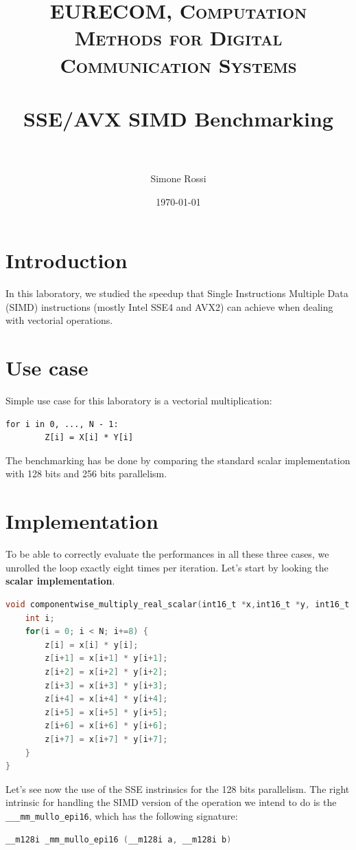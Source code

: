 \documentclass[paper=a4, fontsize=12pt]{scrartcl} %
\title{
\normalfont \normalsize
\textsc{EURECOM, Computation Methods for Digital Communication Systems} \\ [25pt]
\horrule{0.5pt} \\[0.4cm] %
\huge SSE/AVX SIMD Benchmarking \\ %
\horrule{2pt} \\[0.5cm] %
}
\author{Simone Rossi} %
\date{\normalsize\today} %
\numberwithin{equation}{section}
\numberwithin{figure}{section}
\numberwithin{table}{section}
\begin{document}
\maketitle %


\section{Introduction}

In this laboratory, we studied the speedup that Single Instructions Multiple Data (SIMD)
instructions (mostly Intel SSE4 and AVX2) can achieve when dealing with vectorial
operations.

\section{Use case}
Simple use case for this laboratory is a vectorial multiplication:
\begin{lstlisting}[]
    for i in 0, ..., N - 1:
        Z[i] = X[i] * Y[i]
\end{lstlisting}
The benchmarking has be done by comparing the standard scalar implementation with 128 bits and 256 bits
parallelism.

\section{Implementation}
To be able to correctly evaluate the performances in all these three cases, we unrolled the
loop exactly eight times per iteration. Let's start by looking the \textbf{scalar implementation}.

\begin{lstlisting}[language=C, caption=Scalar Implementation with 8-way loop unrolling]
void componentwise_multiply_real_scalar(int16_t *x,int16_t *y, int16_t *z, uint32_t N) {
    int i;
    for(i = 0; i < N; i+=8) {
        z[i] = x[i] * y[i];
        z[i+1] = x[i+1] * y[i+1];
        z[i+2] = x[i+2] * y[i+2];
        z[i+3] = x[i+3] * y[i+3];
        z[i+4] = x[i+4] * y[i+4];
        z[i+5] = x[i+5] * y[i+5];
        z[i+6] = x[i+6] * y[i+6];
        z[i+7] = x[i+7] * y[i+7];
    }
}
\end{lstlisting}

Let's see now the use of the SSE instrinsics for the 128 bits parallelism.
The right intrinsic for handling the SIMD version of the operation we intend to
do is the \texttt{\_\_\_mm\_mullo\_epi16}, which has the following signature:
\begin{lstlisting}[language=C]
__m128i _mm_mullo_epi16 (__m128i a, __m128i b)
\end{lstlisting}
\end{document}
